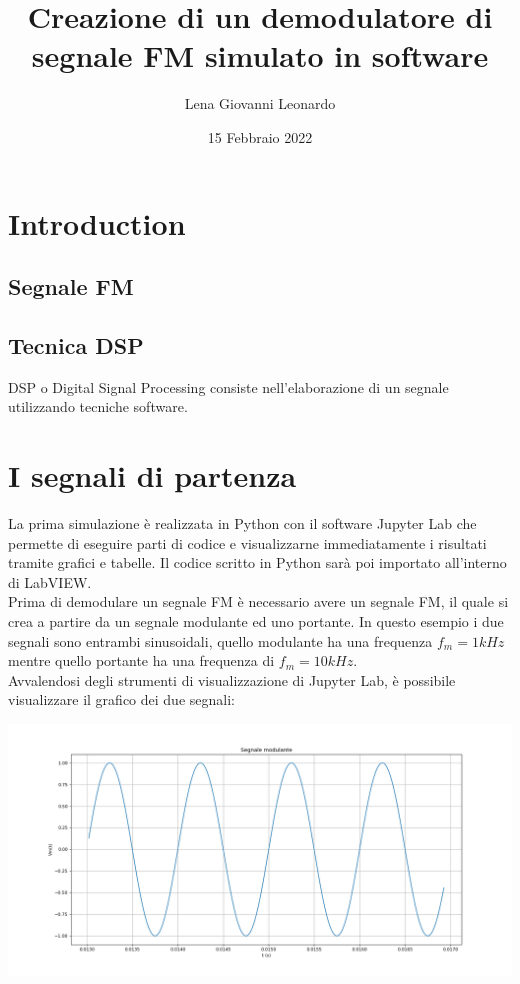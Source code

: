 \documentclass{article}
\title{Creazione di un demodulatore di segnale FM simulato in software}
\author{Lena Giovanni Leonardo}
\date{15 Febbraio 2022}
\begin{document}
\maketitle

\section{Introduction}

\subsection{Segnale FM}

\subsection{Tecnica DSP}
DSP o Digital Signal Processing consiste nell'elaborazione di un segnale utilizzando tecniche software.

\section{I segnali di partenza}
La prima simulazione è realizzata in Python con il software Jupyter Lab che permette di eseguire 
parti di codice e visualizzarne immediatamente i risultati tramite grafici e tabelle. Il codice 
scritto in Python sarà poi importato all'interno di LabVIEW.
\\
Prima di demodulare un segnale FM è necessario avere un segnale FM, il quale si crea a partire da un segnale 
modulante ed uno portante. In questo esempio i due segnali sono entrambi sinusoidali, quello modulante ha una 
frequenza $f_m = 1 kHz$ mentre quello portante ha una frequenza di $f_m = 10 kHz$.
\\
Avvalendosi degli strumenti di visualizzazione di Jupyter Lab, è possibile visualizzare il grafico dei due segnali:
\\
\begin{center}
    \includegraphics[width=\textwidth]{modulante.png}
\end{center}
\end{document}
